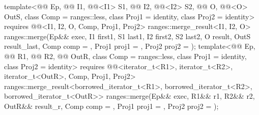 \begin{itemdecl}
template<@@ Ep, @@ I1, @@<I1> S1,
         @@ I2, @@<I2> S2,
         @@ O, @@<O> OutS, class Comp = ranges::less,
         class Proj1 = identity, class Proj2 = identity>
  requires @@<I1, I2, O, Comp, Proj1, Proj2>
  ranges::merge_result<I1, I2, O>
    ranges::merge(Ep&& exec, I1 first1, S1 last1, I2 first2, S2 last2, O result, OutS result_last,
                  Comp comp = {}, Proj1 proj1 = {}, Proj2 proj2 = {});
template<@@ Ep, @@ R1, @@ R2,
         @@ OutR, class Comp = ranges::less,
         class Proj1 = identity, class Proj2 = identity>
  requires @@<iterator_t<R1>, iterator_t<R2>, iterator_t<OutR>, Comp, Proj1, Proj2>
  ranges::merge_result<borrowed_iterator_t<R1>, borrowed_iterator_t<R2>, borrowed_iterator_t<OutR>>
    ranges::merge(Ep&& exec, R1&& r1, R2&& r2, OutR&& result_r,
                  Comp comp = {}, Proj1 proj1 = {}, Proj2 proj2 = {});
\end{itemdecl}

